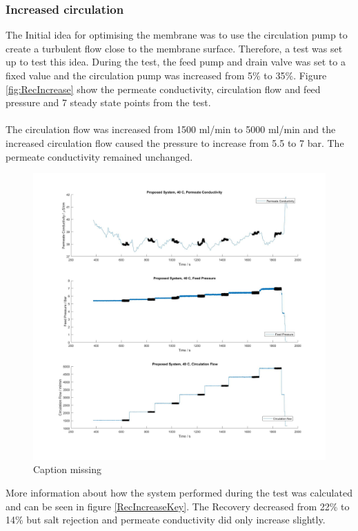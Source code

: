 \newpage
\subsubsection{Increased circulation}

The Initial idea for optimising the membrane was to use the circulation pump to create a turbulent flow close to the membrane surface. Therefore, a test was set up to test this idea.
During the test, the feed pump and drain valve was set to a fixed value and the circulation pump was increased from 5\% to 35\%. Figure \ref{fig:RecIncrease} show the permeate conductivity, circulation flow and feed pressure and 7 steady state points from the test.\\
\\
The circulation flow was increased from 1500 ml/min to 5000 ml/min and the increased circulation flow caused the pressure to increase from 5.5 to 7 bar. The permeate conductivity remained unchanged. 
\begin{figure}[H]
    \centering
    \includegraphics[width=1.1\textwidth]{RecIncrease40}
    \caption{Caption missing}
    \label{fig:RecIncrease40}
\end{figure}  
More information about how the system performed during the test was calculated and can be seen in figure \ref{RecIncreaseKey}. The Recovery decreased from 22\% to 14\%  but salt rejection and permeate conductivity did only increase slightly. \\
